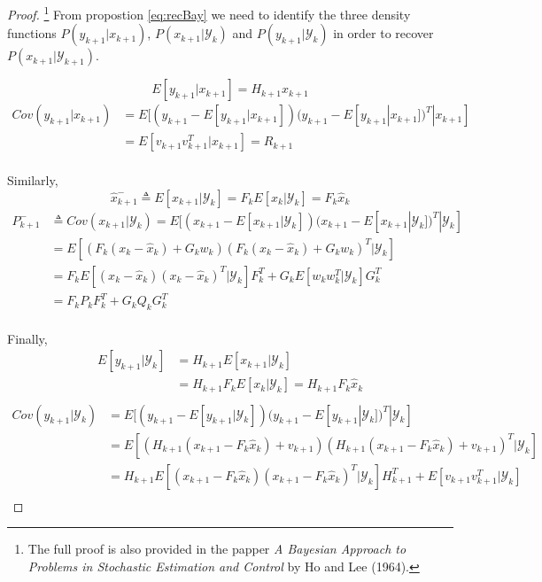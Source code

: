 \documentclass{article}
\theoremstyle{definition}
\theoremstyle{remark}
\newcommand{\filtrationObs}[1]{\ensuremath{\mathscr{Y}_{#1}}}
\begin{document}
\begin{proof}\label{proof:kal}
\footnote{The full proof is also provided in the papper \emph{A Bayesian Approach to Problems in Stochastic Estimation and Control} by Ho and Lee (1964).} From propostion \eqref{eq:recBay} we need to identify the three density functions $P(y_{k+1}|x_{k+1})$, $P(x_{k+1}|\filtrationObs{k})$ and $P(y_{k+1}|\filtrationObs{k})$ in order to recover $P(x_{k+1}|\filtrationObs{k+1})$.

\begin{equation*}
E[y_{k+1}|x_{k+1}]=H_{k+1}x_{k+1}
\end{equation*}
\begin{align*}
Cov(y_{k+1}|x_{k+1})&=E[(y_{k+1}-E[y_{k+1}|x_{k+1}])(y_{k+1}-E[y_{k+1}|x_{k+1}])^T|x_{k+1}]\\
&=E[v_{k+1}v_{k+1}^T|x_{k+1}]=R_{k+1}
\end{align*}
\\
Similarly,
\begin{equation*}
\hat{x}_{k+1}^- \triangleq E[x_{k+1}|\filtrationObs{k}]=F_kE[x_{k}|\filtrationObs{k}]=F_k\hat{x}_k 
\end{equation*}
\begin{align*}
P^-_{k+1} &\triangleq Cov(x_{k+1}|\filtrationObs{k})=E[(x_{k+1}-E[x_{k+1}|\filtrationObs{k}])(x_{k+1}-E[x_{k+1}|\filtrationObs{k}])^T|\filtrationObs{k}]\\
&=E[(F_k(x_{k}-\hat{x}_k)+G_kw_k)(F_k(x_{k}-\hat{x}_k)+G_kw_k)^T|\filtrationObs{k}]\\
&=F_kE[(x_{k}-\hat{x}_k)(x_{k}-\hat{x}_k)^T|\filtrationObs{k}]F_k^T+G_kE[w_kw_k^T|\filtrationObs{k}]G_k^T\\
&=F_kP_kF_k^T+G_kQ_kG_k^T
\end{align*}
\\
Finally,
\begin{align*}
E[y_{k+1}|\filtrationObs{k}]&=H_{k+1}E[x_{k+1}|\filtrationObs{k}]\\
&=H_{k+1}F_kE[x_k|\filtrationObs{k}]=H_{k+1}F_k\hat{x}_k\\
\end{align*}
\begin{align*}
Cov(y_{k+1}|\filtrationObs{k})&=E[(y_{k+1}-E[y_{k+1}|\filtrationObs{k}])(y_{k+1}-E[y_{k+1}|\filtrationObs{k}])^T|\filtrationObs{k}]\\
&=E[(H_{k+1}(x_{k+1}-F_k\hat{x}_k)+v_{k+1})(H_{k+1}(x_{k+1}-F_k\hat{x}_k)+v_{k+1})^T|\filtrationObs{k}]\\
&=H_{k+1}E[(x_{k+1}-F_k\hat{x}_k)(x_{k+1}-F_k\hat{x}_k)^T|\filtrationObs{k}]H_{k+1}^T+E[v_{k+1}v_{k+1}^T|\filtrationObs{k}]\\

\end{align*}
\end{proof}
\end{document}
